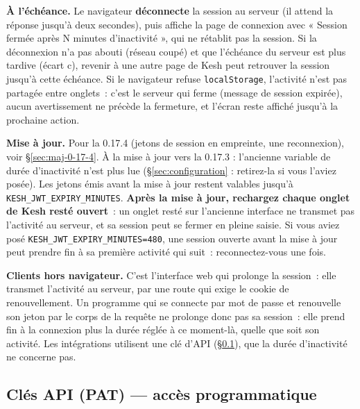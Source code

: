 \documentclass[a4paper,11pt,oneside]{article}
\begin{document}
\begin{sloppypar}
\textbf{À l'échéance.} Le navigateur \textbf{déconnecte} la session au serveur (il attend la réponse jusqu'à deux secondes), puis affiche la page de connexion avec « Session fermée après N minutes d'inactivité », qui ne rétablit pas la session. Si la déconnexion n'a pas abouti (réseau coupé) et que l'échéance du serveur est plus tardive (écart c), revenir à une autre page de Kesh peut retrouver la session jusqu'à cette échéance. Si le navigateur refuse \texttt{localStorage}, l'activité n'est pas partagée entre onglets~: c'est le serveur qui ferme (message de session expirée), aucun avertissement ne précède la fermeture, et l'écran reste affiché jusqu'à la prochaine action.
\end{sloppypar}

\begin{sloppypar}
\textbf{Mise à jour.} Pour la 0.17.4 (jetons de session en empreinte, une reconnexion), voir \S\ref{sec:maj-0-17-4}. À la mise à jour vers la 0.17.3 : l'ancienne variable de durée d'inactivité n'est plus lue (\S\ref{sec:configuration} : retirez-la si vous l'aviez posée). Les jetons émis avant la mise à jour restent valables jusqu'à \texttt{KESH\_JWT\_EXPIRY\_MINUTES}. \textbf{Après la mise à jour, rechargez chaque onglet de Kesh resté ouvert}~: un onglet resté sur l'ancienne interface ne transmet pas l'activité au serveur, et sa session peut se fermer en pleine saisie. Si vous aviez posé \texttt{KESH\_JWT\_EXPIRY\_MINUTES=480}, une session ouverte avant la mise à jour peut prendre fin à sa première activité qui suit~: reconnectez-vous une fois.
\end{sloppypar}

\begin{sloppypar}
\textbf{Clients hors navigateur.} C'est l'interface web qui prolonge la session~: elle transmet l'activité au serveur, par une route qui exige le cookie de renouvellement. Un programme qui se connecte par mot de passe et renouvelle son jeton par le corps de la requête ne prolonge donc pas sa session~: elle prend fin à la connexion plus la durée réglée à ce moment-là, quelle que soit son activité. Les intégrations utilisent une clé d'API (\S\ref{sec:api-keys}), que la durée d'inactivité ne concerne pas.
\end{sloppypar}

\subsection{Clés API (PAT) — accès programmatique}\label{sec:api-keys}
\end{document}
